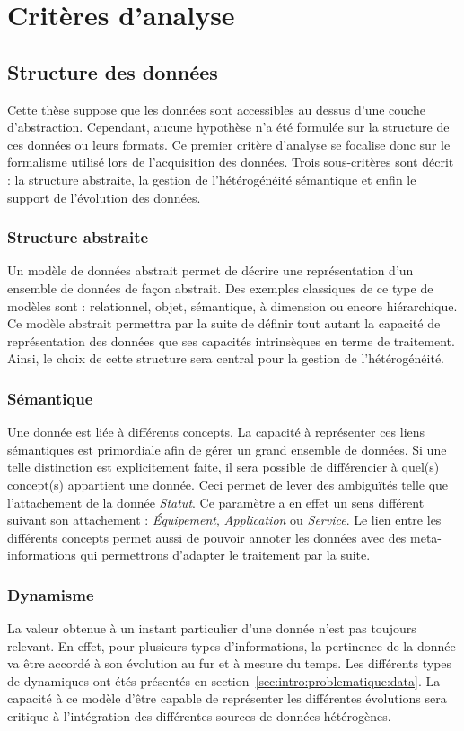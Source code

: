 \section{Critères d'analyse}
\subsection{Structure des données}
Cette thèse suppose que les données sont accessibles au dessus d'une couche d'abstraction. Cependant, aucune hypothèse n'a été formulée sur la structure de ces données ou leurs formats. Ce premier critère d'analyse se focalise donc sur le formalisme utilisé lors de l'acquisition des données. Trois sous-critères sont décrit : la structure abstraite, la gestion de l'hétérogénéité sémantique et enfin le support de l'évolution des données.

\subsubsection{Structure abstraite}
Un modèle de données abstrait permet de décrire une représentation d'un ensemble de données de façon abstrait. Des exemples classiques de ce type de modèles sont : relationnel, objet, sémantique, à dimension ou encore hiérarchique. Ce modèle abstrait permettra par la suite de définir tout autant la capacité de représentation des données que ses capacités intrinsèques en terme de traitement. Ainsi, le choix de cette structure sera central pour la gestion de l'hétérogénéité.
\subsubsection{Sémantique}
Une donnée est liée à différents concepts. La capacité à représenter ces liens sémantiques est primordiale afin de gérer un grand ensemble de données. Si une telle distinction est explicitement faite, il sera possible de différencier à quel(s) concept(s) appartient une donnée. Ceci permet de lever des ambiguïtés telle que l'attachement de la donnée \textit{Statut}. Ce paramètre a en effet un sens différent suivant son attachement : \textit{Équipement}, \textit{Application} ou \textit{Service}. Le lien entre les différents concepts permet aussi de pouvoir annoter les données avec des meta-informations qui permettrons d'adapter le traitement par la suite.
\subsubsection{Dynamisme}
La valeur obtenue à un instant particulier d'une donnée n'est pas toujours relevant. En effet, pour plusieurs types d'informations, la pertinence de la donnée va être accordé à son évolution au fur et à mesure du temps. Les différents types de dynamiques ont étés présentés en section~\ref{sec:intro:problematique:data}. La capacité à ce modèle d'être capable de représenter les différentes évolutions sera critique à l'intégration des différentes sources de données hétérogènes.

